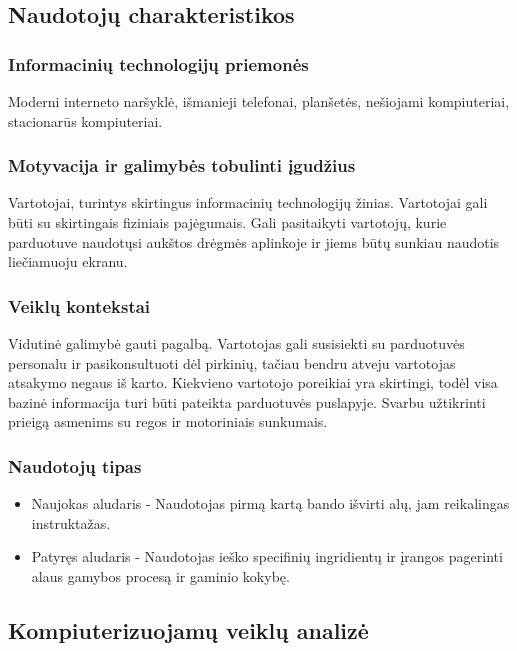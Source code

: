 \documentclass[oneside]{VUMIFPSkursinis}
\begin{document}
	\subsection{Naudotojų charakteristikos}
		\subsubsection{Informacinių technologijų priemonės} 
			Moderni interneto naršyklė, išmanieji telefonai, planšetės, nešiojami kompiuteriai, stacionarūs kompiuteriai. 
		\subsubsection{Motyvacija ir galimybės tobulinti įgudžius}
			 Vartotojai, turintys skirtingus informacinių technologijų žinias. Vartotojai gali būti su skirtingais fiziniais pajėgumais.
			Gali pasitaikyti vartotojų, kurie parduotuve naudotųsi aukštos drėgmės aplinkoje ir jiems būtų sunkiau naudotis liečiamuoju ekranu. 
		\subsubsection{Veiklų kontekstai}
			Vidutinė galimybė gauti pagalbą.
			Vartotojas gali susisiekti su parduotuvės personalu ir pasikonsultuoti dėl pirkinių, tačiau bendru atveju vartotojas atsakymo negaus iš karto.
			Kiekvieno vartotojo poreikiai yra skirtingi, todėl visa bazinė informacija turi būti pateikta parduotuvės puslapyje.
			Svarbu užtikrinti prieigą asmenims su regos ir motoriniais sunkumais.
		\subsubsection{Naudotojų tipas}
			\begin{itemize}
				\item{Naujokas aludaris - Naudotojas pirmą kartą bando išvirti alų, jam reikalingas instruktažas.}
				\item{Patyręs aludaris - Naudotojas ieško specifinių ingridientų ir įrangos pagerinti alaus gamybos procesą ir gaminio kokybę.}
			\end{itemize}
	\subsection{Kompiuterizuojamų veiklų analizė}
\end{document}
